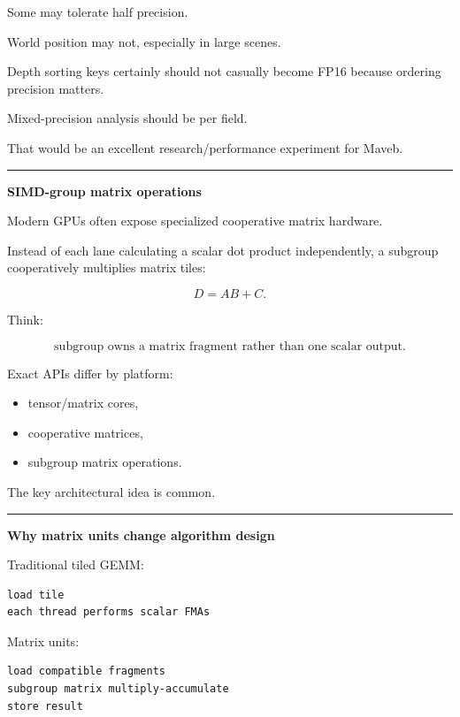 Some may tolerate half precision.

World position may not, especially in large scenes.

Depth sorting keys certainly should not casually become FP16 because ordering precision matters.

Mixed-precision analysis should be per field.

That would be an excellent research/performance experiment for Maveb.

\begin{center}\rule{0.5\linewidth}{0.5pt}\end{center}

\textbf{SIMD-group matrix operations}

Modern GPUs often expose specialized cooperative matrix hardware.

Instead of each lane calculating a scalar dot product independently, a subgroup cooperatively multiplies matrix tiles:

\[
D=
AB+C.
\]

Think:

\[
\boxed{
\text{subgroup owns a matrix fragment rather than one scalar output}.
}
\]

Exact APIs differ by platform:

\begin{itemize}
\tightlist
\item
  tensor/matrix cores,
\item
  cooperative matrices,
\item
  subgroup matrix operations.
\end{itemize}

The key architectural idea is common.

\begin{center}\rule{0.5\linewidth}{0.5pt}\end{center}

\textbf{Why matrix units change algorithm design}

Traditional tiled GEMM:

\protect{}\label{p10-gemm-old}%
\begin{verbatim}
load tile
each thread performs scalar FMAs
\end{verbatim}

Matrix units:

\protect{}\label{p10-gemm-matrix}%
\begin{verbatim}
load compatible fragments
subgroup matrix multiply-accumulate
store result
\end{verbatim}

